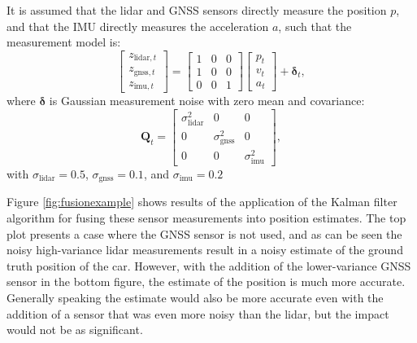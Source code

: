 \begin{example}
It is assumed that the lidar and GNSS sensors directly measure the position $p$, and that the IMU directly measures the acceleration $a$, such that the measurement model is:
\begin{equation*}
\begin{bmatrix}
z_{\text{lidar},t} \\ z_{\text{gnss},t} \\ z_{\text{imu},t}
\end{bmatrix} = \begin{bmatrix}
1 & 0 & 0 \\
1 & 0 & 0 \\
0 & 0 & 1
\end{bmatrix}\begin{bmatrix}
p_{t} \\ v_{t} \\ a_{t}
\end{bmatrix} + \bm{\delta}_t,  
\end{equation*}
where $\bm{\delta}$ is Gaussian measurement noise with zero mean and covariance:
\begin{equation*}
\bm{Q}_t = \begin{bmatrix}
\sigma_{\text{lidar}}^2 & 0 & 0 \\
0 & \sigma_{\text{gnss}}^2 & 0 \\
0 & 0 & \sigma_{\text{imu}}^2
\end{bmatrix},
\end{equation*}
with $\sigma_{\text{lidar}} = 0.5$, $\sigma_{\text{gnss}} = 0.1$, and $\sigma_{\text{imu}} = 0.2$

Figure \ref{fig:fusionexample} shows results of the application of the Kalman filter algorithm for fusing these sensor measurements into position estimates. The top plot presents a case where the GNSS sensor is not used, and as can be seen the noisy high-variance lidar measurements result in a noisy estimate of the ground truth position of the car. However, with the addition of the lower-variance GNSS sensor in the bottom figure, the estimate of the position is much more accurate. Generally speaking the estimate would also be more accurate even with the addition of a sensor that was even more noisy than the lidar, but the impact would not be as significant.


\end{example}
